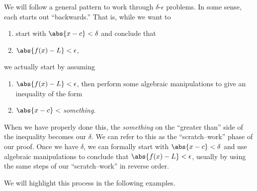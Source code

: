 We will follow a general pattern to work through $\delta$-$\epsilon$ problems. In some sense, each starts out ``backwards.'' That is, while we want to
\begin{enumerate}
	\item start with $\abs{x-c}<\delta$ and conclude that
	\item $\abs{f(x)-L}<\epsilon$,
\end{enumerate}
we actually start by assuming 
\begin{enumerate}
	\item $\abs{f(x)-L}<\epsilon$, then perform some algebraic manipulations to give an inequality of the form
	\item $\abs{x-c}<$ \textit{something}.
\end{enumerate} 
When we have properly done this, the \textit{something} on the ``greater than'' side of the inequality becomes our $\delta$. We can refer to this as the ``scratch--work'' phase of our proof. Once we have $\delta$, we can formally start with $\abs{x-c}<\delta$ and use algebraic manipulations to conclude that $\abs{f(x)-L}<\epsilon$, usually by using the same steps of our ``scratch--work'' in reverse order.

We will highlight this process in the following examples.

